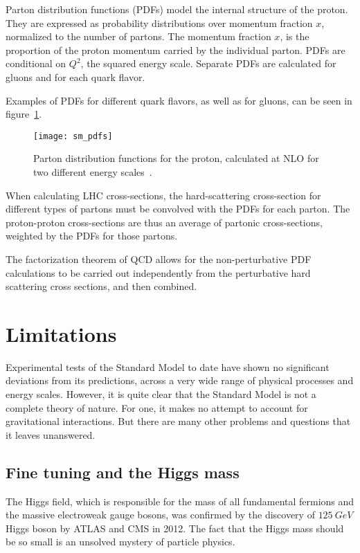 Parton distribution functions (PDFs) model the internal structure of the proton.
They are expressed as probability distributions over momentum fraction $x$, normalized to the number of partons.
The momentum fraction $x$, is the proportion of the proton momentum carried by the individual parton.
PDFs are conditional on $Q^2$, the squared energy scale.
Separate PDFs are calculated for gluons and for each quark flavor.

Examples of PDFs for different quark flavors, as well as for gluons, can be seen in figure~\ref{fig:sm_pdfs}.

\begin{figure}[!ht]
    \centering
\texttt{[image: sm\_pdfs]}
\caption{Parton distribution functions for the proton, calculated at NLO for two different energy scales~\cite{sm-pdf-2009}.}
\label{fig:sm_pdfs}
\end{figure}

When calculating LHC cross-sections, the hard-scattering cross-section for different types of partons
must be convolved with the PDFs for each parton.
The proton-proton cross-sections are thus an average of partonic cross-sections, weighted by the PDFs for those partons.

The factorization theorem of QCD allows for the non-perturbative PDF calculations to be carried out independently from
the perturbative hard scattering cross sections, and then combined.

\section{Limitations}\label{sec:sm_limits}

Experimental tests of the Standard Model to date have shown no significant deviations from its predictions,
across a very wide range of physical processes and energy scales.
However, it is quite clear that the Standard Model is not a complete theory of nature.
For one, it makes no attempt to account for gravitational interactions.
But there are many other problems and questions that it leaves unanswered.

\subsection{Fine tuning and the Higgs mass}\label{subsec:sm_hierarchy}

The Higgs field, which is responsible for the mass of all fundamental fermions and the massive electroweak gauge bosons,
was confirmed by the discovery of $125~GeV$ Higgs boson by ATLAS and CMS in 2012.
The fact that the Higgs mass should be so small is an unsolved mystery of particle physics.

